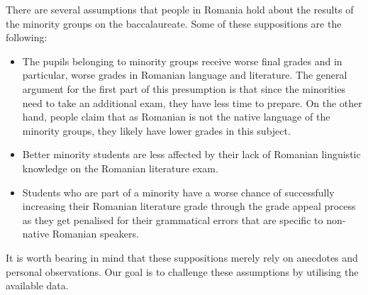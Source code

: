 There are several assumptions that people in Romania hold about the results of the minority groups on the baccalaureate. Some of these suppositions are the following:

\begin{itemize}
\setlength\itemsep{0em}
  \item The pupils belonging to minority groups receive worse final grades and in particular, worse grades in Romanian language and literature. The general argument for the first part of this presumption is that since the minorities need to take an additional exam, they have less time to prepare. On the other hand, people claim that as Romanian is not the native language of the minority groups, they likely have lower grades in this subject.
  \item Better minority students are less affected by their lack of Romanian linguistic knowledge on the Romanian literature exam.
  \item Students who are part of a minority have a worse chance of successfully increasing their Romanian literature grade through the grade appeal process as they get penalised for their grammatical errors that are specific to non-native Romanian speakers.
\end{itemize}

It is worth bearing in mind that these suppositions merely rely on anecdotes and personal observations. Our goal is to challenge these assumptions by utilising the available data.




